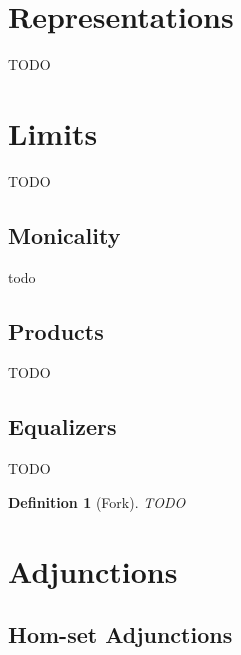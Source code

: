 \documentclass{article}
\theoremstyle{break}
\newtheorem{definition}[theorem]{Definition}
\numberwithin{theorem}{section}
\begin{document}
\section{Representations}
TODO

\section{Limits}
TODO

\subsection{Monicality}
todo

\subsection{Products}
TODO

\subsection{Equalizers}
TODO

\begin{definition}[Fork]
    TODO
\end{definition}


\section{Adjunctions}

\subsection{Hom-set Adjunctions}
\end{document}
